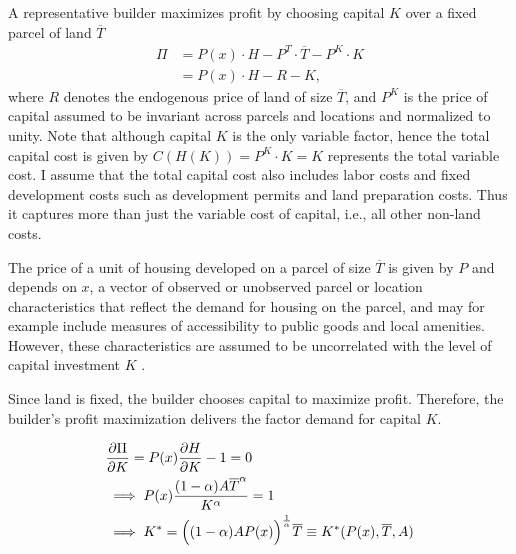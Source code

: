 \documentclass[
  12pt,
]{article}
\begin{document}
A representative builder maximizes profit by choosing capital \(K\) over a fixed parcel of land \(\overline{T}\) \[\begin{aligned}
\Pi &= P(x) \cdot H - P^T \cdot \overline{T} - P^K\cdot K\\
&=P(x)\cdot H - R - K,
\end{aligned}\]where \(R\) denotes the endogenous price of land of size \(\overline{T}\), and \(P^K\) is the price of capital assumed to be invariant across parcels and locations and normalized to unity. Note that although capital \(K\) is the only variable factor, hence the total capital cost is given by \(C(H(K)) = P^K\cdot K = K\) represents the total variable cost. I assume that the total capital cost also includes labor costs and fixed development costs such as development permits and land preparation costs. Thus it captures more than just the variable cost of capital, i.e., all other non-land costs.

The price of a unit of housing developed on a parcel of size \(\overline{T}\) is given by \(P\) and depends on \(x\), a vector of observed or unobserved parcel or location characteristics that reflect the demand for housing on the parcel, and may for example include measures of accessibility to public goods and local amenities. However, these characteristics are assumed to be uncorrelated with the level of capital investment \(K\) \citep{combes-etal2021}.

Since land is fixed, the builder chooses capital to maximize profit. Therefore, the builder's profit maximization delivers the factor demand for capital \(K\).

\[\begin{aligned}
&\frac{\partial \Pi}{\partial K} = P(x) \frac{\partial H}{\partial K} - 1 = 0\\
&\implies P(x) \frac{(1-\alpha) A \overline{T}^\alpha}{K^\alpha} = 1 \\
 &\implies K^* = \Bigl((1-\alpha)AP(x)\Bigr)^{\frac{1}{\alpha}}\overline{T}\equiv K^*(P(x), \overline{T}, A) \end{aligned}\]
\end{document}
